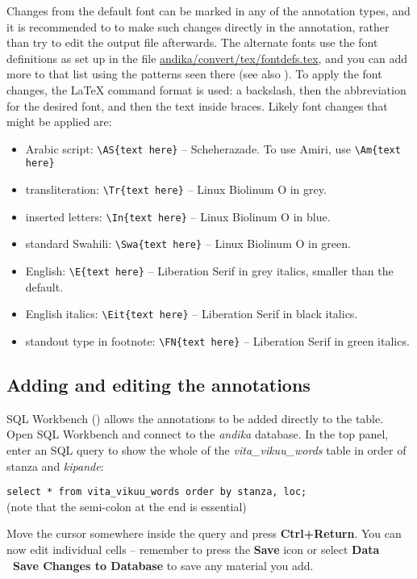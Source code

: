 Changes from the default font can be marked in any of the annotation types, and it is recommended to to make such changes directly in the annotation, rather than try to edit the output file afterwards.  The alternate fonts use the font definitions as set up in the file \url{andika/convert/tex/fontdefs.tex}, and you can add more to that list using the patterns seen there (see also ).  To apply the font changes, the LaTeX command format is used: a backslash, then the abbreviation for the desired font, and then the text inside braces.  Likely font changes that might be applied are:
\begin{itemize}
\item Arabic script: \verb|\AS{text here}| -- Scheherazade.  To use Amiri, use \verb|\Am{text here}|
\item transliteration: \verb|\Tr{text here}| -- Linux Biolinum O in grey.
\item inserted letters: \verb|\In{text here}| -- Linux Biolinum O in blue.
\item standard Swahili: \verb|\Swa{text here}| -- Linux Biolinum O in green.
\item English: \verb|\E{text here}| -- Liberation Serif in grey italics, smaller than the default.
\item English italics: \verb|\Eit{text here}| -- Liberation Serif in black italics.	
\item standout type in footnote: \verb|\FN{text here}| -- Liberation Serif in green italics. 
\end{itemize}


\subsection{Adding and editing the annotations}

SQL Workbench () allows the annotations to be added directly to the table.  Open SQL Workbench and connect to the \textit{andika} database.  In the top panel, enter an SQL query to show the whole of the \textit{vita_vikuu_words} table in order of stanza and \textit{kipande}:

\verb|select * from vita_vikuu_words order by stanza, loc;|\\
(note that the semi-colon at the end is essential)

Move the cursor somewhere inside the query and press \textbf{Ctrl+Return}.  You can now edit individual cells -- remember to press the \textbf{Save} icon or select \textbf{Data \textrightarrow\ Save Changes to Database} to save any material you add.

